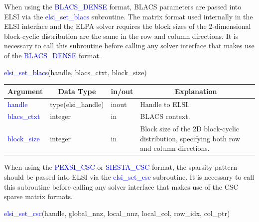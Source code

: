 \documentclass{report}
\begin{document}
When using the \textcolor{blue}{BLACS\_DENSE} format, BLACS parameters are passed into ELSI via the \textcolor{blue}{elsi\_set\_blacs} subroutine. The matrix format used internally in the ELSI interface and the ELPA solver requires the block sizes of the 2-dimensional block-cyclic distribution are the same in the row and column directions. It is necessary to call this subroutine before calling any solver interface that makes use of the \textcolor{blue}{BLACS\_DENSE} format.
\begin{labeling}{\hspace{6cm}}
\item [\hspace{0.3cm} \textcolor{blue}{elsi\_set\_blacs}(handle, blacs\_ctxt, block\_size)]
\end{labeling}

\begin{tabular}[]{|p{30mm}|p{30mm}|p{15mm}|p{90mm}|}
\hline
\multicolumn{1}{|c|}{\textbf{Argument}} & \multicolumn{1}{c|}{\textbf{Data Type}} & \multicolumn{1}{c|}{\textbf{in/out}} & \multicolumn{1}{c|}{\textbf{Explanation}}\\
\hline
\textcolor{blue}{handle}      & type(elsi\_handle) & inout & Handle to ELSI.\\
\hline
\textcolor{blue}{blacs\_ctxt} & integer            & in    & BLACS context.\\
\hline
\textcolor{blue}{block\_size} & integer            & in    & Block size of the 2D block-cyclic distribution, specifying both row and column directions.\\
\hline
\end{tabular}

When using the \textcolor{blue}{PEXSI\_CSC} or \textcolor{blue}{SIESTA\_CSC} format, the sparsity pattern should be passed into ELSI via the \textcolor{blue}{elsi\_set\_csc} subroutine. It is necessary to call this subroutine before calling any solver interface that makes use of the CSC sparse matrix formats.
\begin{labeling}{\hspace{6cm}}
\item [\hspace{0.3cm} \textcolor{blue}{elsi\_set\_csc}(handle, global\_nnz, local\_nnz, local\_col, row\_idx, col\_ptr)]
\end{labeling}
\end{document}
